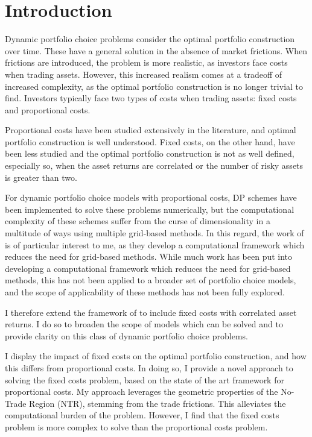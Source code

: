 \documentclass[11pt]{article}
\begin{document}
\fi

\section{Introduction}\label{sec:Introduction}

Dynamic portfolio choice problems consider the optimal portfolio construction over time.
These have a general solution in the absence of market frictions.
When frictions are introduced, the problem is more realistic, as 
investors face costs when trading assets.
However, this increased realism comes at a tradeoff of increased complexity,
as the optimal portfolio construction is no longer trivial to find.
Investors typically face two types of costs when trading assets: fixed costs and proportional costs.

Proportional costs have been studied extensively in the literature, and optimal portfolio construction is well understood.
Fixed costs, on the other hand, have been less studied and the optimal portfolio construction is not as well defined,
especially so, when the asset returns are correlated or the number of risky assets is greater than two.


For dynamic portfolio choice models with proportional costs, \ac{DP} schemes have been implemented to solve these problems numerically,
but the computational complexity of these schemes suffer from the curse of dimensionality
in a multitude of ways using multiple grid-based methods. In this regard, the work of \autocite{Scheidegger2023} is of particular interest to me,
as they develop a computational framework which reduces the need for grid-based methods.
While much work has been put into developing a computational framework which reduces the need for grid-based methods,
this has not been applied to a broader set of portfolio choice models, 
and the scope of applicability of these methods has not been fully explored.

I therefore extend the framework of \autocite{Scheidegger2023} to include fixed costs with correlated asset returns.
I do so to broaden the scope of models which can be solved and to provide clarity on this class of dynamic portfolio choice problems.

I display the impact of fixed costs on the optimal portfolio construction, and how this differs from proportional costs.
In doing so, I provide a novel approach to solving the fixed costs problem, based on the state of the art framework for proportional costs.
My approach leverages the geometric properties of the No-Trade Region (NTR), stemming from the trade frictions.
This alleviates the computational burden of the problem. However, I find that the fixed costs problem is more complex to solve than the proportional costs problem.
\end{document}
